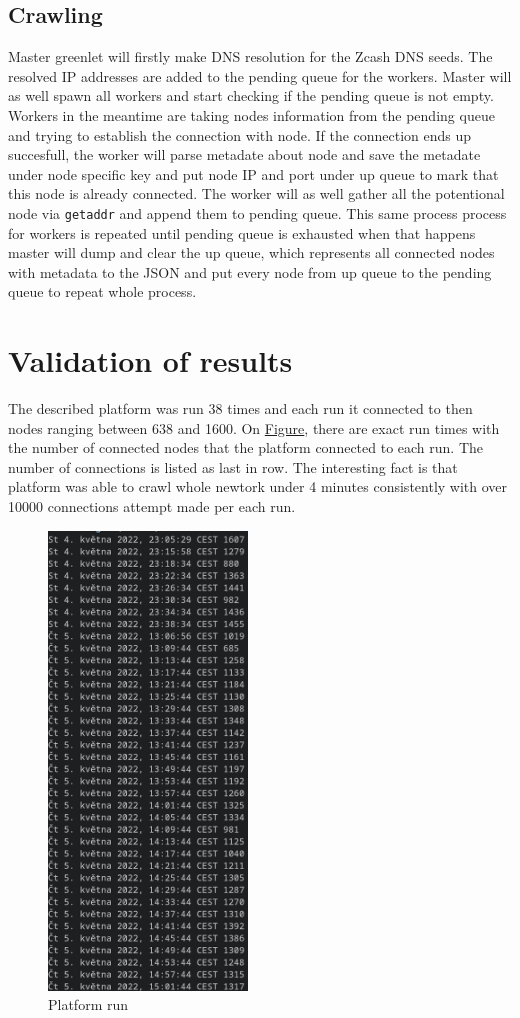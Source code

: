 \documentclass[11pt]{article}
\begin{document}
\subsection{Crawling}
\label{sec:orgb47e4c2}
Master greenlet will firstly make DNS resolution for the Zcash DNS seeds. The resolved IP addresses are added to the pending queue for the workers. Master will as well spawn all workers and start checking if the pending queue is not empty. Workers in the meantime are taking nodes information from the pending queue and trying to establish the connection with node. If the connection ends up succesfull, the worker will parse metadate about node and save the metadate under node specific key and put node IP and port under up queue to mark that this node is already connected. The worker will as well gather all the potentional node via \texttt{getaddr} and append them to pending queue. This same process process for workers is repeated until pending queue is exhausted when that happens master will dump and clear the up queue, which represents all connected nodes with metadata to the JSON and put every node from up queue to the pending queue to repeat whole process.





\section{Validation of results}
\label{sec:org2be1e02}
The described platform was run 38 times and each run it connected to then nodes ranging between 638 and 1600. On \hyperref[fig-platform]{Figure}, there are exact run times with the number of connected nodes that the platform connected to each run. The number of connections is listed as last in row. The interesting fact is that platform was able to crawl whole newtork under 4 minutes consistently with over 10000 connections attempt made per each run.
\begin{figure}[htbp]
\centering
\includegraphics[width=200px]{platform_run.png}
\caption{\label{fig-platform}Platform run}
\end{figure}
\end{document}
